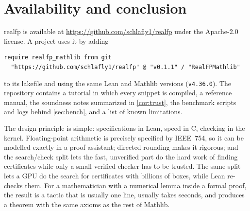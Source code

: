 \documentclass[11pt]{article}
\theoremstyle{definition}
\theoremstyle{remark}
\newcommand{\lean}[1]{\texttt{#1}}
\newcommand{\realfp}{\textsf{realfp}}
\begin{document}
\section{Availability and conclusion}

\realfp{} is available at \url{https://github.com/schlafly1/realfp} under
the Apache-2.0 license. A project uses it by adding
\begin{lstlisting}
require realfp_mathlib from git
  "https://github.com/schlafly1/realfp" @ "v0.1.1" / "RealFPMathlib"
\end{lstlisting}
to its lakefile and using the same Lean and Mathlib versions
(\lean{v4.36.0}). The repository contains a tutorial in which every snippet
is compiled, a reference manual, the soundness notes summarized in
\cref{cor:trust}, the benchmark scripts and logs behind \cref{sec:bench},
and a list of known limitations.

The design principle is simple: specifications in Lean, speed in C,
checking in the kernel. Floating-point arithmetic is precisely specified by
IEEE~754, so it can be modelled exactly in a proof assistant; directed
rounding makes it rigorous; and the search/check split lets the fast,
unverified part do the hard work of finding certificates while only a small
verified checker has to be trusted. The same split lets a GPU do the search
for certificates with billions of boxes, while Lean re-checks them. For a mathematician with a numerical
lemma inside a formal proof, the result is a tactic that is usually one
line, usually takes seconds, and produces a theorem with the same axioms as
the rest of Mathlib.



\end{document}
